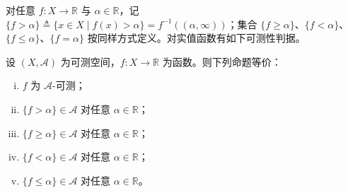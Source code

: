 \documentclass[../../main.tex]{subfiles}%
\begin{document}
对任意 $f:X\to\mathbb{R}$ 与 $\alpha\in\mathbb{R}$，记 $\{f>\alpha\}\triangleq\{x\in X\mid f(x)>\alpha\}=f^{-1}((\alpha,\infty))$；集合 $\{f\geqslant\alpha\}$、$\{f<\alpha\}$、$\{f\leqslant\alpha\}$、$\{f=\alpha\}$ 按同样方式定义。对实值函数有如下可测性判据。

\begin{proposition}\label{proposition:ch02-可测判据}\label{proposition:ch02-Borel判定}
设 $(X,\mathscr A)$ 为可测空间，$f:X\to\mathbb{R}$ 为函数。则下列命题等价：
\begin{enumerate}[(i)]
\item $f$ 为 $\mathscr A$-可测；
\item $\{f>\alpha\}\in\mathscr A$ 对任意 $\alpha\in\mathbb{R}$；
\item $\{f\geqslant\alpha\}\in\mathscr A$ 对任意 $\alpha\in\mathbb{R}$；
\item $\{f<\alpha\}\in\mathscr A$ 对任意 $\alpha\in\mathbb{R}$；
\item $\{f\leqslant\alpha\}\in\mathscr A$ 对任意 $\alpha\in\mathbb{R}$。
\end{enumerate}
\end{proposition}
\end{document}
